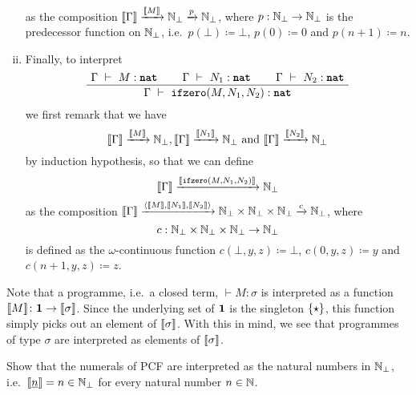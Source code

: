 \begin{definition}
\begin{enumerate}[(i)]
\[    \]
    as the composition
    \(\llbracket\Gamma\rrbracket \xrightarrow{\llbracket M\rrbracket} \mathbb N_\bot \xrightarrow{p}
    \mathbb N_\bot\), where \(p : \mathbb N_\bot \to \mathbb N_\bot\) is the predecessor
    function on \(\mathbb N_\bot\), i.e.\ \(p(\bot) \coloneqq \bot\),
    \(p(0) \coloneqq 0\) and \(p(n+1) \coloneqq n\).
  \item
    Finally, to interpret
    \[
      \def\fCenter{\ \vdash\ }
      \Axiom$\Gamma \fCenter M : \pcfnat$
      \Axiom$\Gamma \fCenter N_1 : \pcfnat$
      \Axiom$\Gamma \fCenter N_2 : \pcfnat$
      \TrinaryInf$\Gamma \fCenter \pcfifz(M,N_1,N_2) : \pcfnat$
      \DisplayProof
    \]
    we first remark that we have
    \[
      \llbracket\Gamma\rrbracket \xrightarrow{\llbracket M\rrbracket} \mathbb N_\bot,
      \llbracket\Gamma\rrbracket \xrightarrow{\llbracket N_1\rrbracket} \mathbb N_\bot \text{ and }
      \llbracket\Gamma\rrbracket \xrightarrow{\llbracket N_2\rrbracket} \mathbb N_\bot
    \]
    by induction hypothesis, so that we can define
    \[
      \llbracket\Gamma\rrbracket \xrightarrow{\llbracket\operatorname{\texttt{ifzero}}(M,N_1,N_2)\rrbracket} \mathbb N_\bot
    \]
    as the composition
    \(\llbracket\Gamma\rrbracket
    \xrightarrow{\langle{\llbracket M\rrbracket,\llbracket N_1\rrbracket,\llbracket N_2\rrbracket}\rangle}
    {{\mathbb N_\bot} \times {\mathbb N_\bot} \times {\mathbb N_\bot}} \xrightarrow{c}
    \mathbb N_\bot\), where
    \[
      c : \mathbb N_\bot \times \mathbb N_\bot \times \mathbb N_\bot \to \mathbb N_\bot
    \] is defined as the \(\omega\)-continuous function
    \(c(\bot,y,z) \coloneqq \bot\), \(c(0,y,z) \coloneqq y\) and
    \(c(n+1,y,z) \coloneqq z\).
  \end{enumerate}
\end{definition}

\begin{remark}
  Note that a programme, i.e.\ a closed term, \({} \vdash M : \sigma\) is
  interpreted as a function
  \(\llbracket M\rrbracket \colon \mathbf 1 \to \llbracket\sigma\rrbracket\).
  Since the underlying set of \(\mathbf 1\) is the singleton \(\{\star\}\), this
  function simply picks out an element of \(\llbracket\sigma\rrbracket\).
  With this in mind, we see that programmes of type \(\sigma\) are interpreted
  as elements of \(\llbracket\sigma\rrbracket\).
\end{remark}


\begin{exercise}\label{exer:interpretation-of-numerals}
  Show that the numerals of PCF are interpreted as the natural numbers in
  \(\mathbb N_\bot\), i.e.\ \(\llbracket\underline{n}\rrbracket = n \in \mathbb N_\bot\) for every
  natural number \(n \in \mathbb N\).
\end{exercise}

